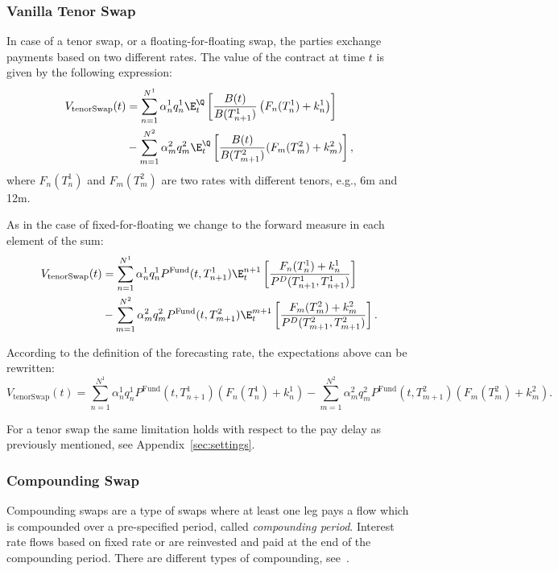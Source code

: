 \documentclass[]{pmv_report} %
\begin{document}
\subsubsection{Vanilla Tenor Swap}
In case of a tenor swap, or a floating-for-floating swap, the parties exchange payments based on two different \Libor rates.
The value of the contract at time $t$ is given by the following expression:
\begin{align*}
  V_{\text{tenorSwap}}(t) &= \sum_{n=1}^{N^1} \alpha_{n}^1 q_n^1\E_t^{\Q} \left[ \frac{B(t)}{B(T_{n+1}^1)} \left( F_n(T_n^1)+k_n^1\right) \right] \\
  &- \sum_{m=1}^{N^2}\alpha_m^2 q_m^2\E_t^{\Q} \left[ \frac{B(t)}{B(T_{m+1}^2)} (F_m(T_m^2)+k_m^2)\right],
\end{align*}
where $F_n(T_n^1)$ and $F_m(T_m^2)$ are two \Libor rates with different tenors, e.g., 6m and 12m.

As in the case of fixed-for-floating we change to the forward measure in each element of the sum:
\begin{align}
  V_{\text{tenorSwap}}(t) &= \sum_{n=1}^{N^1} \alpha_{n}^1 q_n^1 P^{\text{Fund}}(t,T_{n+1}^1) \E_t^{n+1} \left[\frac{ F_n(T_n^1)+k_n^1}{P^D(T_{n+1}^1,T_{n+1}^1)}\right] \nonumber \\
  &- \sum_{m=1}^{N^2}\alpha_m^{2} q_m^2 P^{\text{Fund}}(t,T_{m+1}^2)\E_t^{m+1} \left[\frac{F_m(T_m^2)+k_m^2}{P^D(T_{m+1}^2,T_{m+1}^2)}\right].
\end{align}

According to the definition of the forecasting \Libor rate, the expectations above can be rewritten:
\begin{equation}
  V_{\text{tenorSwap}}(t)=\sum_{n=1}^{N^1} \alpha_{n}^1 q_n^1 P^{\text{Fund}}(t,T_{n+1}^1) ( F_n(T_n^1)+k_n^1)-
   \sum_{m=1}^{N^2}\alpha_m^{2} q_m^2 P^{\text{Fund}}(t,T_{m+1}^2) (F_m(T_m^2)+k_m^2).
\end{equation}

For a tenor swap the same limitation holds with respect to the pay delay as previously mentioned, see Appendix~\ref{sec:settings}.

\subsubsection{Compounding Swap}
Compounding swaps are a type of swaps where at least one leg pays a flow which is compounded over a pre-specified period, called \textit{compounding period}.
Interest rate flows based on fixed rate or \Libor are reinvested and paid at the end of the compounding period.
There are different types of compounding, see~\cite{Mx.GenericFunctionalities}.
\end{document}
